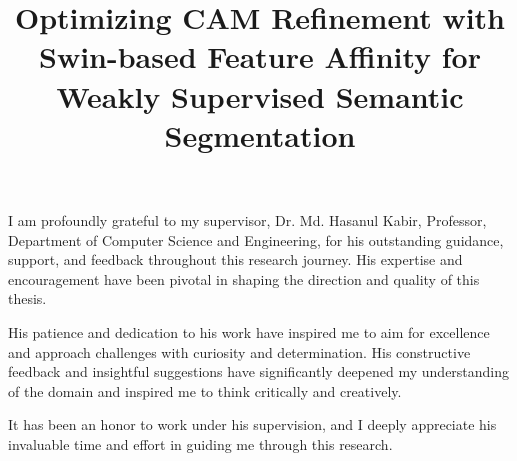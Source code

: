 \documentclass{iutbscthesis}
\title{\Large{Optimizing CAM Refinement with Swin-based Feature Affinity for Weakly Supervised Semantic Segmentation}}
\begin{document}

\coverpage


\titlepage

\declarationofcandidate


\tableofcontents
\listoffigures
\listoftables

\clearpage



\begin{acknowledgement}
    I am profoundly grateful to my supervisor, Dr. Md. Hasanul Kabir, Professor, Department of Computer Science and Engineering, for his outstanding guidance, support, and feedback throughout this research journey. His expertise and encouragement have been pivotal in shaping the direction and quality of this thesis.
    
    His patience and dedication to his work have inspired me to aim for excellence and approach challenges with curiosity and determination. His constructive feedback and insightful suggestions have significantly deepened my understanding of the domain and inspired me to think critically and creatively.
    
    It has been an honor to work under his supervision, and I deeply appreciate his invaluable time and effort in guiding me through this research.
\end{acknowledgement}
\end{document}
